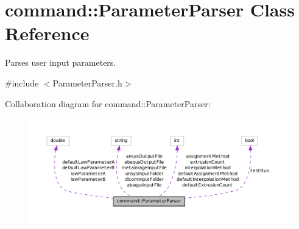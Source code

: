 \hypertarget{classcommand_1_1_parameter_parser}{
\section{command::ParameterParser Class Reference}
\label{classcommand_1_1_parameter_parser}
}


Parses user input parameters.  




{\ttfamily \#include $<$ParameterParser.h$>$}



Collaboration diagram for command::ParameterParser:\nopagebreak
\begin{figure}[H]
\begin{center}
\leavevmode
\includegraphics[width=400pt]{classcommand_1_1_parameter_parser__coll__graph}
\end{center}
\end{figure}
